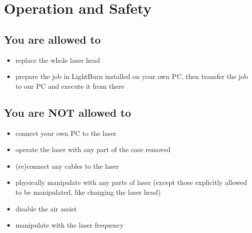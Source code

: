 \documentclass[fleqn]{article}
\begin{document}
\section{Operation and Safety}
\begin{multicols}{2}\setlength{\parindent}{1em}
	
		\begingroup
		\color{industra-manual-darkgreen}
		\subsection{You are allowed to}
		\begin{itemize}[noitemsep,topsep=0pt]
			
			\item replace the whole laser head
			\item prepare the job in LightBurn installed on your own PC, then transfer the job to our PC and execute it from there
			
		\end{itemize}
		\vfill\null
		\endgroup
	
	\columnbreak
	
	\begingroup
		
		\color{industra-manual-darkred}
		\subsection{You are NOT allowed to}
		\begin{itemize}[noitemsep,topsep=0pt]
			
			\item connect your own PC to the laser
			\item operate the laser with any part of the case removed
			\item (re)connect any cables to the laser
			\item physically manipulate with any parts of laser (except those explicitly allowed to be manipulated, like changing the laser head)
			\item disable the air assist
			\item manipulate with the laser frequency
			
		\end{itemize}
		\vfill\null
		
		\endgroup
		\columnbreak
	

\end{multicols}
\end{document}
